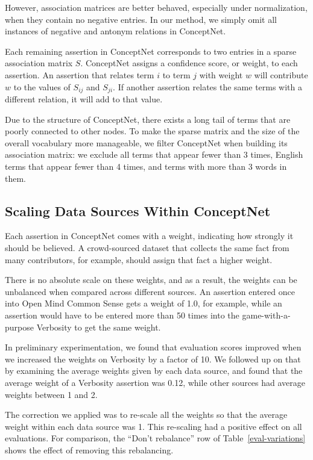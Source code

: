 \documentclass[letterpaper]{article}
\begin{document}
However, association matrices are better behaved, especially under
normalization, when they contain no negative entries. In our method, we simply
omit all instances of negative and antonym relations in ConceptNet.

Each remaining assertion in ConceptNet corresponds to two entries in a sparse
association matrix $S$. ConceptNet assigns a confidence score, or weight, to
each assertion. An assertion that relates term $i$ to term $j$ with weight $w$
will contribute $w$ to the values of $S_{ij}$ and $S_{ji}$. If another
assertion relates the same terms with a different relation, it will add to that
value.

Due to the structure of ConceptNet, there exists a long tail of terms that are
poorly connected to other nodes. To make the sparse matrix and the size of the
overall vocabulary more manageable, we filter ConceptNet when building its
association matrix: we exclude all terms that appear fewer than 3 times, English
terms that appear fewer than 4 times, and terms with more than 3 words in them.

\subsection{Scaling Data Sources Within ConceptNet}

Each assertion in ConceptNet comes with a weight, indicating how strongly it
should be believed. A crowd-sourced dataset that collects the same fact from
many contributors, for example, should assign that fact a higher weight.

There is no absolute scale on these weights, and as a result, the weights can
be unbalanced when compared across different sources. An assertion entered once
into Open Mind Common Sense gets a weight of 1.0, for example, while an
assertion would have to be entered more than 50 times into the
game-with-a-purpose Verbosity to get the same weight.

In preliminary experimentation, we found that evaluation scores improved when
we increased the weights on Verbosity by a factor of 10. We followed up on that
by examining the average weights given by each data source, and found that the
average weight of a Verbosity assertion was 0.12, while other sources had
average weights between 1 and 2.

The correction we applied was to re-scale all the weights so that the average
weight within each data source was 1. This re-scaling had a positive effect
on all evaluations. For comparison, the ``Don't rebalance'' row of
Table~\ref{eval-variations} shows the effect of removing this rebalancing.
\end{document}
